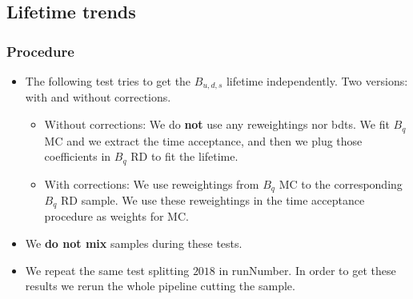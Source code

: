 %
%
%


\subsection{Lifetime trends}

\begin{frame}
  \frametitle{Procedure}

  \begin{itemize}
    \item  The following test tries to get the $B_{u,d,s}$ lifetime
    independently. Two versions: with and without corrections.
    \begin{itemize}
      \item Without corrections: We do \textbf{not} use any reweightings nor bdts. 
      We fit $B_q$ MC and we extract the time acceptance, and then we plug those
      coefficients in $B_q$ RD to fit the lifetime.
      \item With corrections: We use reweightings from $B_q$ MC to the
      corresponding $B_q$ RD sample. We use these reweightings in the time 
      acceptance procedure as weights for MC.
    \end{itemize}
    \item We \textbf{do not mix} samples during these tests.
    \item We repeat the same test splitting $2018$ in runNumber. In order to
    get these results we rerun the whole pipeline cutting the sample.
  \end{itemize}
\end{frame}




